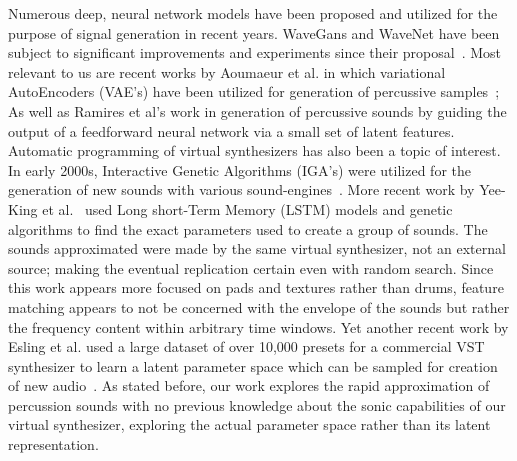 \documentclass[\main/thesis.tex]{subfiles}
\begin{document}
\begin{center}
\begin{table}[h*]
\hline
\caption{Quick reference for related works}
\end{table}
\end{center}
Numerous deep, neural network models have been proposed and utilized for the purpose of signal generation in recent years. WaveGans and WaveNet have been subject to significant improvements and experiments since their proposal~\cite{nsynth2017,yamamoto2020parallel,oord2017parallel}. Most relevant to us are recent works by Aoumaeur et al. in which variational AutoEncoders (VAE's) have been utilized for generation of percussive samples~\cite{aouameur2019neural}; As well as Ramires et al's work in generation of percussive sounds by guiding the output of a feedforward neural network via a small set of latent features. 
Automatic programming of virtual synthesizers has also been a topic of interest. In early 2000s, Interactive Genetic Algorithms (IGA's) were utilized for the generation of new sounds with various sound-engines~\cite{johnson1999exploring,dahlstedt2001creating}. More recent work by Yee-King et al.~\cite{yee2018automatic} used Long short-Term Memory (LSTM) models and genetic algorithms to find the exact parameters used to create a group of sounds. The sounds approximated were made by the same virtual synthesizer, not an external source; making the eventual replication certain even with random search. Since this work appears more focused on pads and textures rather than drums, feature matching appears to not be concerned with the envelope of the sounds but rather the frequency content within arbitrary time windows. Yet another recent work by Esling et al. used a large dataset of over 10,000 presets for a commercial VST synthesizer to learn a latent parameter space which can be sampled for creation of new audio~\cite{esling2019universal}. As stated before, our work explores the rapid approximation of percussion sounds with no previous knowledge about the sonic capabilities of our virtual synthesizer, exploring the actual parameter space rather than its latent representation.

 
\end{document}
